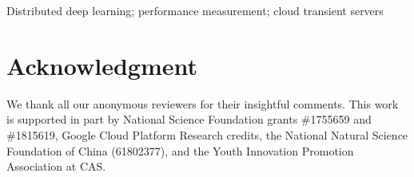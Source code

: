 \documentclass[10pt,conference,compsocconf]{IEEEtran}
\begin{document}
\maketitle

\begin{abstract}

\end{abstract}

\begin{IEEEkeywords}
Distributed deep learning; performance measurement; cloud transient servers
\end{IEEEkeywords}


%



%
%

%


\section*{Acknowledgment}
We thank all our anonymous reviewers for their insightful comments. This work is supported in part by
National Science Foundation grants \#1755659 and \#1815619,
Google Cloud Platform Research credits, the National Natural Science Foundation
of China (61802377), and the Youth Innovation Promotion Association at CAS.

\balance
{\scriptsize }

\end{document}
